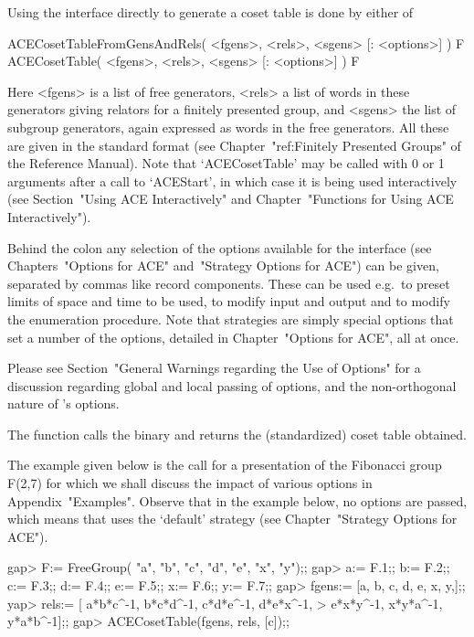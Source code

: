 \beginitems

Using the {\ACE} interface directly to generate a coset table is  done
by either of

\>ACECosetTableFromGensAndRels( <fgens>, <rels>, <sgens> [: <options>] ) F
\>ACECosetTable( <fgens>, <rels>, <sgens> [: <options>] ) F

Here <fgens> is a list of free generators, <rels> a list of  words  in
these generators giving relators for a finitely presented  group,  and
<sgens> the list of subgroup generators, again expressed as  words  in
the free generators. All these are given in the standard {\GAP} format
(see Chapter~"ref:Finitely Presented Groups" of the  {\GAP}  Reference
Manual). Note that `ACECosetTable' may be called with 0 or 1 arguments
after  a  call  to  `ACEStart',  in  which  case  it  is  being   used
interactively   (see    Section~"Using    ACE    Interactively"    and
Chapter~"Functions for Using ACE Interactively").

Behind the colon any  selection  of  the  options  available  for  the
interface (see Chapters~"Options for ACE"  and~"Strategy  Options  for
ACE") can be given, separated by commas like record components.  These
can be used e.g.~to preset limits of space and time  to  be  used,  to
modify input and output and to modify the enumeration procedure.  Note
that strategies are simply special options that set a  number  of  the
options, detailed in Chapter~"Options for ACE", all at once.

Please see Section~"General Warnings regarding the Use of Options" for
a discussion regarding global and local passing of  options,  and  the
non-orthogonal nature of {\ACE}'s options.

The function calls the {\ACE} binary and  returns  the  (standardized)
coset table obtained.

The example given  below  is  the  call  for  a  presentation  of  the
Fibonacci group F(2,7) for  which  we  shall  discuss  the  impact  of
various options in Appendix~"Examples". Observe that  in  the  example
below, no options  are  passed,  which  means  that  {\ACE}  uses  the
`default' strategy (see Chapter~"Strategy Options for ACE").

\beginexample
gap> F:= FreeGroup( "a", "b", "c", "d", "e", "x", "y");;
gap> a:= F.1;; b:= F.2;; c:= F.3;; d:= F.4;; e:= F.5;; x:= F.6;; y:= F.7;;
gap> fgens:= [a, b, c, d, e, x, y,];;
yap> rels:= [ a*b*c^-1, b*c*d^-1, c*d*e^-1, d*e*x^-1, 
>             e*x*y^-1, x*y*a^-1, y*a*b^-1];;
gap> ACECosetTable(fgens, rels, [c]);;
\endexample

